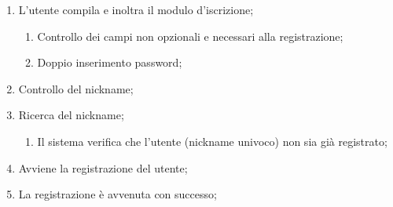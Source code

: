\begin{enumerate}
\item L'utente compila e inoltra il modulo d'iscrizione;
\begin{enumerate}
\item Controllo dei campi non opzionali e necessari alla registrazione;
\item Doppio inserimento password;
\end{enumerate}
\item Controllo del nickname;
\item Ricerca del nickname;
\begin{enumerate}
\item Il sistema verifica che l'utente (nickname univoco) non sia già registrato;
\end{enumerate}
\item Avviene la registrazione del utente;
\item La registrazione è avvenuta con successo;
\end{enumerate}
